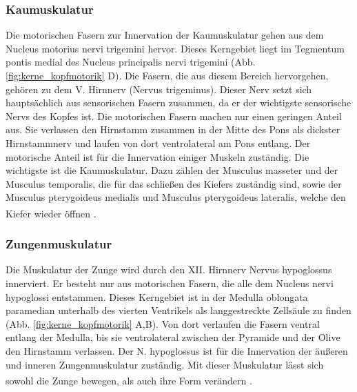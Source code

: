 \documentclass[12pt,a4paper,pdftex]{article}
\begin{document}
\subsubsection*{Kaumuskulatur} 
Die motorischen Fasern zur Innervation der Kaumuskulatur gehen aus dem Nucleus motorius nervi trigemini  hervor. Dieses Kerngebiet liegt im Tegmentum pontis medial des Nucleus principalis nervi trigemini (Abb. \ref{fig:kerne_kopfmotorik} D). Die Fasern, die aus diesem Bereich hervorgehen, gehören zu dem V. Hirnnerv (Nervus trigeminus). Dieser Nerv setzt sich hauptsächlich aus sensorischen Fasern zusammen, da er der wichtigste sensorische Nervs des Kopfes ist. Die motorischen Fasern machen nur einen geringen Anteil aus. Sie verlassen den Hirnstamm zusammen in der Mitte des Pons als dickster Hirnstammnerv und laufen von dort ventrolateral am Pons entlang. Der motorische Anteil ist für die Innervation einiger Muskeln zuständig. Die wichtigste ist die Kaumuskulatur. Dazu zählen der Musculus masseter und der Musculus temporalis, die für das schließen des Kiefers zuständig sind, sowie der Musculus pterygoideus medialis und Musculus pterygoideus lateralis, welche den Kiefer wieder öffnen \textsuperscript{\cite[10]{crossman2014neuroanatomy}}.

\subsubsection*{Zungenmuskulatur}
Die Muskulatur der Zunge wird durch den XII. Hirnnerv Nervus hypoglossus  innerviert. Er besteht nur aus motorischen Fasern, die alle dem Nucleus nervi hypoglossi  entstammen. Dieses Kerngebiet ist in der Medulla oblongata paramedian unterhalb des vierten Ventrikels als langgestreckte Zellsäule zu finden (Abb. \ref{fig:kerne_kopfmotorik} A,B). Von dort verlaufen die Fasern ventral entlang der Medulla, bis sie ventrolateral zwischen der Pyramide und der Olive den Hirnstamm verlassen. Der N. hypoglossus ist für die Innervation der äußeren und inneren Zungenmuskulatur zuständig. Mit dieser Muskulatur lässt sich sowohl die Zunge bewegen, als auch ihre Form verändern \textsuperscript{\cite[10]{crossman2014neuroanatomy}}.
\end{document}
